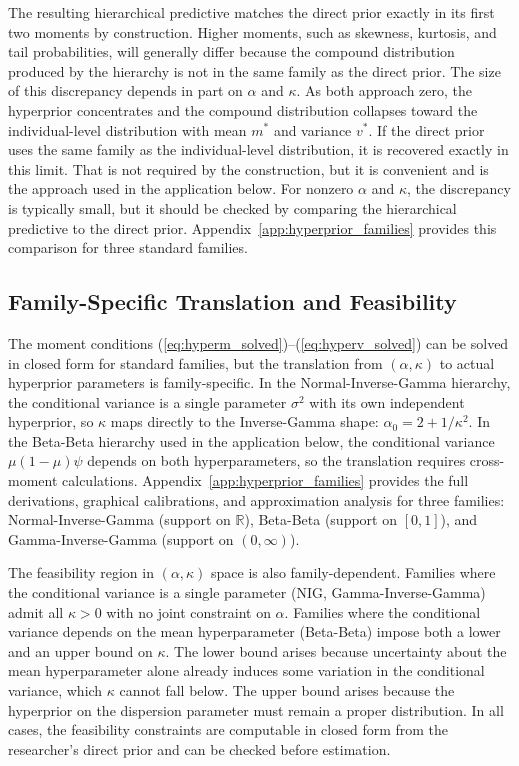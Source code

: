 \documentclass[12pt,a4paper]{article}
\theoremstyle{definition}
\theoremstyle{remark}
\newcommand{\dpm}{m^*}
\newcommand{\dpv}{v^*}
\begin{document}
The resulting hierarchical predictive matches the direct prior exactly in its
first two moments by construction. Higher moments, such as skewness, kurtosis,
and tail probabilities, will generally differ because the compound
distribution produced by the hierarchy is not in the same family as the direct
prior. The size of this discrepancy depends in part on $\alpha$ and $\kappa$. As
both approach zero, the hyperprior concentrates and the compound distribution
collapses toward the individual-level distribution with mean $\dpm$ and
variance $\dpv$. If the direct prior uses the same family as the
individual-level distribution, it is recovered exactly in this limit. That is
not required by the construction, but it is convenient and is the approach used
in the application below. For nonzero $\alpha$ and $\kappa$, the discrepancy is
typically small, but it should be checked by comparing the hierarchical
predictive to the direct prior. Appendix~\ref{app:hyperprior_families} provides
this comparison for three standard families.

\subsection{Family-Specific Translation and Feasibility}
\label{sec:family_translation}

The moment conditions (\ref{eq:hyperm_solved})--(\ref{eq:hyperv_solved}) can be
solved in closed form for standard families, but the translation from
$(\alpha, \kappa)$ to actual hyperprior parameters is family-specific. In the
Normal-Inverse-Gamma hierarchy, the conditional variance is a single parameter
$\sigma^2$ with its own independent hyperprior, so $\kappa$ maps directly to
the Inverse-Gamma shape: $\alpha_0 = 2 + 1/\kappa^2$. In the Beta-Beta
hierarchy used in the application below, the conditional variance
$\mu(1-\mu)\psi$ depends on both hyperparameters, so the translation requires
cross-moment calculations. Appendix~\ref{app:hyperprior_families} provides the
full derivations, graphical calibrations, and approximation analysis for three
families: Normal-Inverse-Gamma (support on $\mathbb{R}$), Beta-Beta (support on
$[0,1]$), and Gamma-Inverse-Gamma (support on $(0,\infty)$).

The feasibility region in $(\alpha, \kappa)$ space is also family-dependent.
Families where the conditional variance is a single parameter (NIG,
Gamma-Inverse-Gamma) admit all $\kappa > 0$ with no joint constraint on $\alpha$.
Families where the conditional variance depends on the mean hyperparameter
(Beta-Beta) impose both a lower and an upper bound on $\kappa$. The lower
bound arises because uncertainty about the mean hyperparameter alone already
induces some variation in the conditional variance, which $\kappa$ cannot
fall below. The upper bound arises because the hyperprior on the dispersion
parameter must remain a proper distribution. In all cases, the feasibility
constraints are computable in closed
form from the researcher's direct prior and can be checked before estimation.
\end{document}
